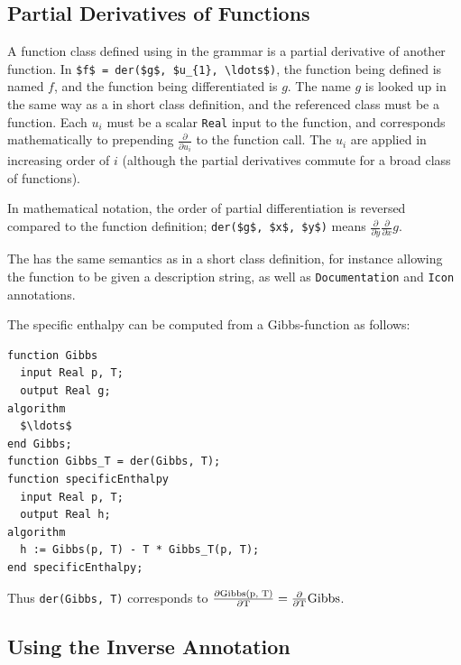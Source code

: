 \subsection{Partial Derivatives of Functions}\label{partial-derivatives-of-functions}

A function class defined using  in the grammar is a partial derivative of another function.
In \lstinline!$f$ = der($g$, $u_{1}, \ldots$)!, the function being defined is named $f$, and the function being differentiated is $g$.
The name $g$ is looked up in the same way as a in short class definition, and the referenced class must be a function.
Each $u_{i}$ must be a scalar {\lstinline!Real!} input to the function, and corresponds mathematically to prepending $\frac{\partial}{\partial u_{i}}$ to the function call.
The $u_{i}$ are applied in increasing order of $i$ (although the partial derivatives commute for a broad class of functions).

\begin{nonnormative}
In mathematical notation, the order of partial differentiation is reversed compared to the function definition; \lstinline!der($g$, $x$, $y$)! means $\frac{\partial}{\partial y}\frac{\partial}{\partial x}g$.
\end{nonnormative}

The  has the same semantics as in a short class definition, for instance allowing the function to be given a description string, as well as \lstinline!Documentation! and \lstinline!Icon! annotations.

\begin{example}
The specific enthalpy can be computed from a Gibbs-function as follows:
\begin{lstlisting}[language=modelica]
function Gibbs
  input Real p, T;
  output Real g;
algorithm
  $\ldots$
end Gibbs;
function Gibbs_T = der(Gibbs, T);
function specificEnthalpy
  input Real p, T;
  output Real h;
algorithm
  h := Gibbs(p, T) - T * Gibbs_T(p, T);
end specificEnthalpy;
\end{lstlisting}
Thus \lstinline!der(Gibbs, T)! corresponds to $\frac{\partial \text{\lstinline!Gibbs(p, T)!}}{\partial \text{\lstinline!T!}} = \frac{\partial}{\partial \text{\lstinline!T!}}\text{\lstinline!Gibbs!}$.
\end{example}

\subsection{Using the Inverse Annotation}\label{using-the-inverse-annotation}

